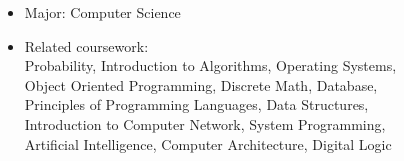 \documentclass[10pt,a4paper,ragged2e]{altacv}
\begin{document}
\tagline{}

\begin{fullwidth}
\makecvheader
\end{fullwidth}



\begin{itemize}
\item Major: Computer Science
\smallskip
\item Related coursework:\\  Probability, Introduction to Algorithms, Operating Systems, \\ Object Oriented Programming, Discrete Math,  Database,\\ Principles of Programming Languages, Data Structures,\\ Introduction to Computer Network, System Programming, \\ Artificial Intelligence, Computer Architecture, Digital Logic
\end{itemize}

\end{document}
